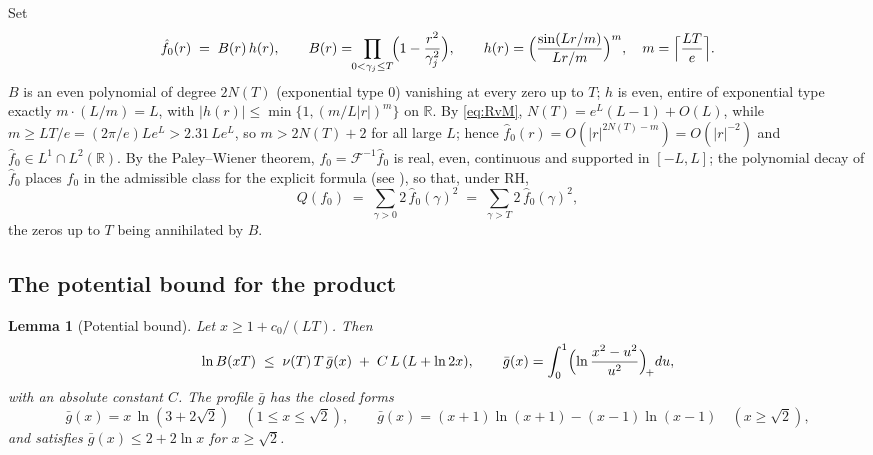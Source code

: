 ﻿\documentclass[11pt]{article}
\newtheorem{lemma}[theorem]{Lemma}
\newcommand{\R}{\mathbb{R}}
\newcommand{\fhat}{\hat f}
\begin{document}
Set
\[
  \fhat_0(r)\;=\;B(r)\,h(r),\qquad
  B(r)=\!\!\prod_{0<\gamma_j\le T}\!\Bigl(1-\frac{r^2}{\gamma_j^2}\Bigr),
  \qquad
  h(r)=\Bigl(\frac{\sin(Lr/m)}{Lr/m}\Bigr)^{m},\quad
  m=\Bigl\lceil \frac{LT}{e}\Bigr\rceil .
\]
$B$ is an even polynomial of degree $2N(T)$ (exponential type $0$)
vanishing at every zero up to $T$; $h$ is even, entire of exponential
type exactly $m\cdot(L/m)=L$, with
$|h(r)|\le\min\{1,(m/L|r|)^{m}\}$ on $\R$.  By \eqref{eq:RvM},
$N(T)=e^{L}(L-1)+O(L)$, while $m\ge LT/e=(2\pi/e)Le^{L}>2.31\,Le^{L}$,
so $m>2N(T)+2$ for all large $L$; hence
$\fhat_0(r)=O(|r|^{2N(T)-m})=O(|r|^{-2})$ and
$\fhat_0\in L^{1}\cap L^{2}(\R)$.  By the Paley--Wiener theorem,
$f_0=\mathcal F^{-1}\fhat_0$ is real, even, continuous and supported
in $[-L,L]$; the polynomial decay of $\fhat_0$ places $f_0$ in the
admissible class for the explicit formula (see
\cite[\S2]{Bombieri2000}), so that, under RH,
\[
  Q(f_0)\;=\;\sum_{\gamma>0}2\,\fhat_0(\gamma)^{2}
  \;=\;\sum_{\gamma>T}2\,\fhat_0(\gamma)^{2},
\]
the zeros up to $T$ being annihilated by $B$.

\subsection{The potential bound for the product}

\begin{lemma}[Potential bound]\label{lem:potential}
Let $x\ge1+c_0/(LT)$.  Then
\[
  \ln B(xT)\;\le\;\nu(T)\,T\,\bar g(x)\;+\;C\,L\,(L+\ln 2x),
  \qquad
  \bar g(x)=\int_{0}^{1}\Bigl(\ln\frac{x^{2}-u^{2}}{u^{2}}\Bigr)_{\!+}du,
\]
with an absolute constant $C$.  The profile $\bar g$ has the closed
forms
\[
  \bar g(x)=x\,\ln(3+2\sqrt2)\quad(1\le x\le\sqrt2),
  \qquad
  \bar g(x)=(x{+}1)\ln(x{+}1)-(x{-}1)\ln(x{-}1)\quad(x\ge\sqrt2),
\]
and satisfies $\bar g(x)\le 2+2\ln x$ for $x\ge\sqrt2$.
\end{lemma}
\end{document}
